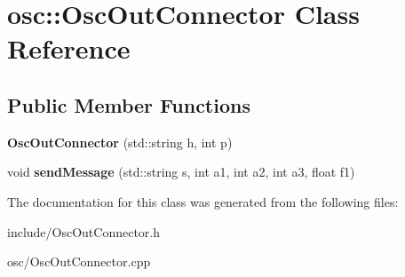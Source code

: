 \hypertarget{classosc_1_1OscOutConnector}{\section{osc\-:\-:Osc\-Out\-Connector Class Reference}
\label{classosc_1_1OscOutConnector}
}
\subsection*{Public Member Functions}
\begin{DoxyCompactItemize}
\item 
\hypertarget{classosc_1_1OscOutConnector_a7dde00203135c4a673e56f02dec774b4}{{\bfseries Osc\-Out\-Connector} (std\-::string h, int p)}\label{classosc_1_1OscOutConnector_a7dde00203135c4a673e56f02dec774b4}

\item 
\hypertarget{classosc_1_1OscOutConnector_a8b3bcadf0295998b42753161ae9d17ee}{void {\bfseries send\-Message} (std\-::string s, int a1, int a2, int a3, float f1)}\label{classosc_1_1OscOutConnector_a8b3bcadf0295998b42753161ae9d17ee}

\end{DoxyCompactItemize}


The documentation for this class was generated from the following files\-:\begin{DoxyCompactItemize}
\item 
include/Osc\-Out\-Connector.\-h\item 
osc/Osc\-Out\-Connector.\-cpp\end{DoxyCompactItemize}
